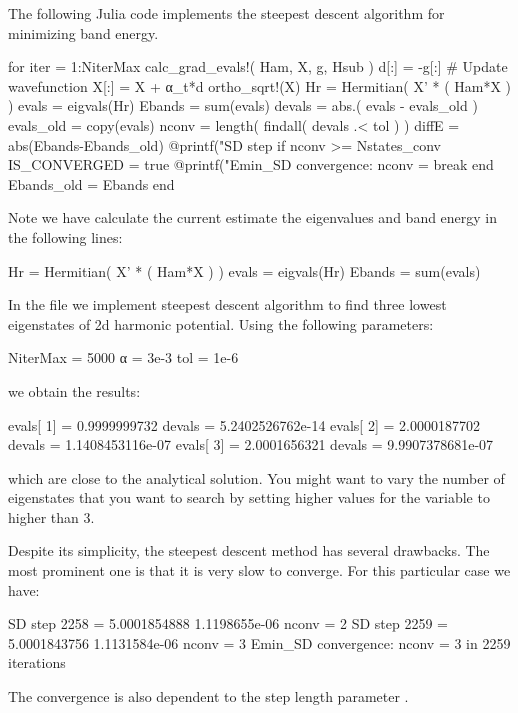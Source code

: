The following Julia code implements the steepest descent algorithm for minimizing band energy.
\begin{juliacode}
for iter = 1:NiterMax
  calc_grad_evals!( Ham, X, g, Hsub )
  d[:] = -g[:]
  # Update wavefunction
  X[:] = X + α_t*d
  ortho_sqrt!(X)
  Hr = Hermitian( X' * ( Ham*X ) )
  evals = eigvals(Hr)
  Ebands = sum(evals)
  devals = abs.( evals - evals_old )
  evals_old = copy(evals)
  nconv = length( findall( devals .< tol ) )
  diffE = abs(Ebands-Ebands_old)
  @printf("SD step %
  if nconv >= Nstates_conv
      IS_CONVERGED = true
      @printf("Emin_SD convergence: nconv = %
      break
  end
  Ebands_old = Ebands
end
\end{juliacode}

Note we have calculate the current estimate the eigenvalues and band energy in the following
lines:
\begin{juliacode}
Hr = Hermitian( X' * ( Ham*X ) )
evals = eigvals(Hr)
Ebands = sum(evals)
\end{juliacode}

In the file  we implement steepest descent algorithm
to find three lowest eigenstates of 2d harmonic potential.
Using the following parameters:
\begin{juliacode}
NiterMax = 5000
α = 3e-3
tol = 1e-6
\end{juliacode}
we obtain the results:
\begin{textcode}
evals[  1] =       0.9999999732 devals =   5.2402526762e-14
evals[  2] =       2.0000187702 devals =   1.1408453116e-07
evals[  3] =       2.0001656321 devals =   9.9907378681e-07  
\end{textcode}
which are close to the analytical solution. You might want to vary the number of eigenstates
that you want to search by setting higher values for the variable  to
higher than 3.

Despite its simplicity, the steepest descent method has several drawbacks.
The most prominent one is that it is very slow to converge. For this particular case
we have:
\begin{textcode}
SD step     2258 =       5.0001854888   1.1198655e-06  nconv =     2
SD step     2259 =       5.0001843756   1.1131584e-06  nconv =     3
Emin_SD convergence: nconv =     3 in  2259 iterations
\end{textcode}
The convergence is also dependent to the step length parameter .


